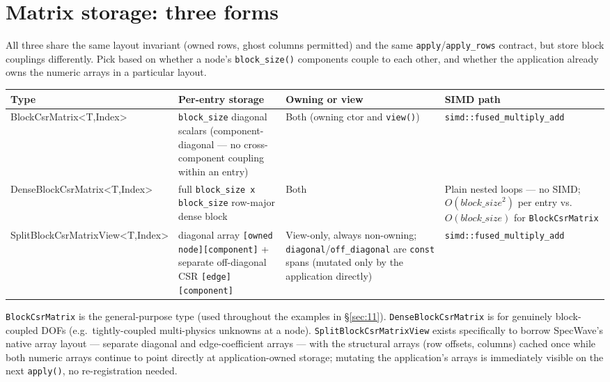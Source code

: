 \documentclass[11pt,a4paper]{report}
\newcommand{\secref}[1]{\S\ref{#1}}
\begin{document}
\section{Matrix storage: three forms}
\label{sec:3.4}

All three share the same layout invariant (owned rows, ghost columns
permitted) and the same \lstinline!apply!/\lstinline!apply_rows! contract, but store
block couplings differently. Pick based on whether a node's
\lstinline!block_size()! components couple to each other, and whether the
application already owns the numeric arrays in a particular layout.

\begin{longtable}{L{0.28\textwidth}P{0.30\textwidth}C{0.14\textwidth}P{0.18\textwidth}}
\toprule
Type & Per-entry storage & Owning or view & SIMD path \\
\midrule
\endhead
BlockCsrMatrix<T,Index> & \lstinline!block_size! diagonal scalars (component-diagonal --- no cross-component coupling within an entry) & Both (owning ctor and \lstinline!view()!) & \lstinline!simd::fused_multiply_add! \\
DenseBlockCsrMatrix<T,Index> & full \lstinline!block_size x block_size! row-major dense block & Both & Plain nested loops --- no SIMD; $O(\mathit{block\_size}^2)$ per entry vs.\ $O(\mathit{block\_size})$ for \lstinline!BlockCsrMatrix! \\
SplitBlockCsrMatrixView<T,Index> & diagonal array \lstinline![owned node][component]! + separate off-diagonal CSR \lstinline![edge][component]! & View-only, always non-owning; \lstinline!diagonal!/\lstinline!off_diagonal! are \lstinline!const! spans (mutated only by the application directly) & \lstinline!simd::fused_multiply_add! \\
\bottomrule
\end{longtable}

\lstinline!BlockCsrMatrix! is the general-purpose type (used throughout the
examples in \secref{sec:11}). \lstinline!DenseBlockCsrMatrix! is for genuinely
block-coupled DOFs (e.g.\ tightly-coupled multi-physics unknowns at a
node). \lstinline!SplitBlockCsrMatrixView! exists specifically to borrow
SpecWave's native array layout --- separate diagonal and edge-coefficient
arrays --- with the structural arrays (row offsets, columns) cached once
while both numeric arrays continue to point directly at
application-owned storage; mutating the application's arrays is
immediately visible on the next \lstinline!apply()!, no re-registration
needed.
\end{document}
